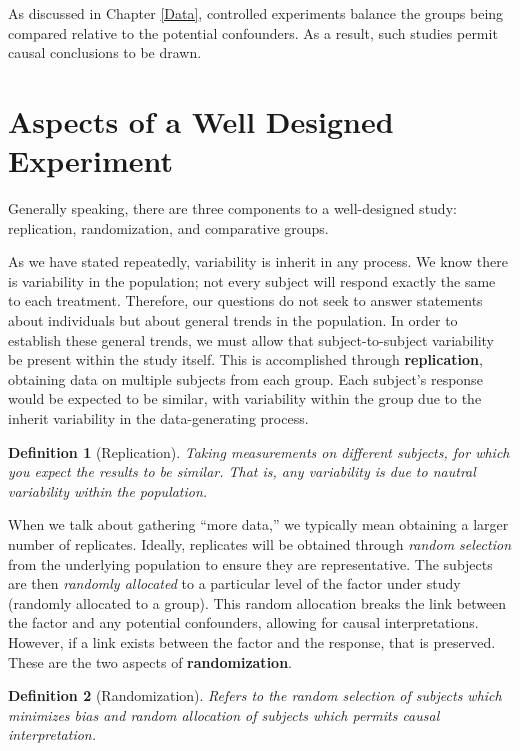 \documentclass[
]{book}
\theoremstyle{plain}
\theoremstyle{mydefn}
\newtheorem{definition}{Definition}[chapter]
\theoremstyle{myexmpl}
\theoremstyle{remark}
\begin{document}
As discussed in Chapter \ref{Data}, controlled experiments balance the groups being compared relative to the potential confounders. As a result, such studies permit causal conclusions to be drawn.

\hypertarget{aspects-of-a-well-designed-experiment}{%
\section{Aspects of a Well Designed Experiment}\label{aspects-of-a-well-designed-experiment}}

Generally speaking, there are three components to a well-designed study: replication, randomization, and comparative groups.

As we have stated repeatedly, variability is inherit in any process. We know there is variability in the population; not every subject will respond exactly the same to each treatment. Therefore, our questions do not seek to answer statements about individuals but about general trends in the population. In order to establish these general trends, we must allow that subject-to-subject variability be present within the study itself. This is accomplished through \textbf{replication}, obtaining data on multiple subjects from each group. Each subject's response would be expected to be similar, with variability within the group due to the inherit variability in the data-generating process.

\begin{definition}[Replication]
\protect\hypertarget{def:defn-replication}{}{\label{def:defn-replication} {} }Taking measurements on different subjects, for which you expect the results to be similar. That is, any variability is due to nautral variability within the population.
\end{definition}

When we talk about gathering ``more data,'' we typically mean obtaining a larger number of replicates. Ideally, replicates will be obtained through \emph{random selection} from the underlying population to ensure they are representative. The subjects are then \emph{randomly allocated} to a particular level of the factor under study (randomly allocated to a group). This random allocation breaks the link between the factor and any potential confounders, allowing for causal interpretations. However, if a link exists between the factor and the response, that is preserved. These are the two aspects of \textbf{randomization}.

\begin{definition}[Randomization]
\protect\hypertarget{def:defn-randomization}{}{\label{def:defn-randomization} {} }Refers to the random \emph{selection} of subjects which minimizes bias and random \emph{allocation} of subjects which permits causal interpretation.
\end{definition}
\end{document}
